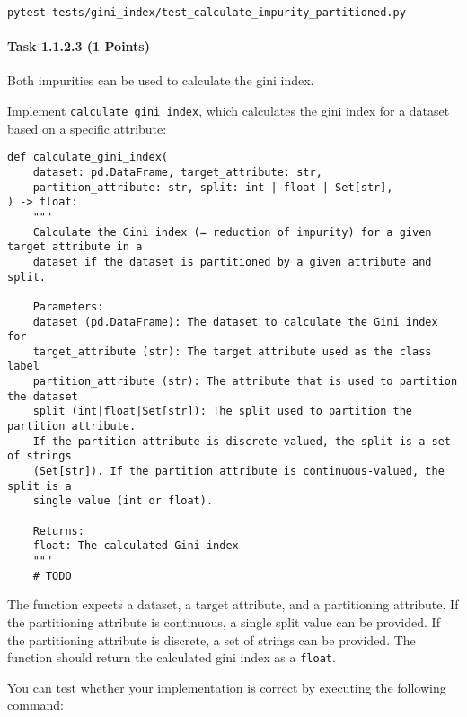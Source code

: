 \documentclass[
english,
smallborders
]{i6prcsht}
\newcommand{\points}[1]{\hfill \color{red}(#1 Points)\color{black}}
\begin{document}
\begin{lstlisting}
pytest tests/gini_index/test_calculate_impurity_partitioned.py
\end{lstlisting}

\vspace*{0.1cm}

\paragraph*{Task 1.1.2.3 \points{1}} \hfill

Both impurities can be used to calculate the gini index.

Implement \texttt{calculate\_gini\_index}, which calculates the gini index for a dataset based on a specific attribute:

\vspace*{0.3cm}

\begin{lstlisting}
def calculate_gini_index(
	dataset: pd.DataFrame, target_attribute: str,
	partition_attribute: str, split: int | float | Set[str],
) -> float:
	"""
	Calculate the Gini index (= reduction of impurity) for a given target attribute in a
	dataset if the dataset is partitioned by a given attribute and split.

	Parameters:
	dataset (pd.DataFrame): The dataset to calculate the Gini index for
	target_attribute (str): The target attribute used as the class label
	partition_attribute (str): The attribute that is used to partition the dataset
	split (int|float|Set[str]): The split used to partition the partition attribute.
	If the partition attribute is discrete-valued, the split is a set of strings
	(Set[str]). If the partition attribute is continuous-valued, the split is a
	single value (int or float).

	Returns:
	float: The calculated Gini index
	"""
	# TODO
\end{lstlisting}

\vspace*{0.1cm}

The function expects a dataset, a target attribute, and a partitioning attribute. If the partitioning attribute is continuous, a single split value can be provided. If the partitioning attribute is discrete, a set of strings can be provided. The function should return the calculated gini index as a \texttt{float}.

You can test whether your implementation is correct by executing the following command:
\end{document}
